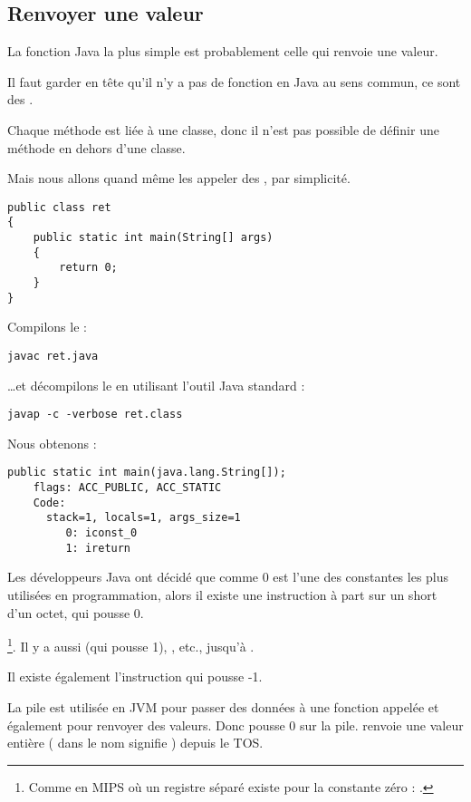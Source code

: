 \subsection{Renvoyer une valeur}

La fonction Java la plus simple est probablement celle qui renvoie une valeur.

Il faut garder en tête qu'il n'y a pas de fonction  en Java au sens commun,
ce sont des .

Chaque méthode est liée à une classe, donc il n'est pas possible de définir
une méthode en dehors d'une classe.

Mais nous allons quand même les appeler des , par simplicité.

\begin{lstlisting}[style=customjava]
public class ret
{
	public static int main(String[] args) 
	{
		return 0;
	}
}
\end{lstlisting}

Compilons le :

\begin{lstlisting}
javac ret.java
\end{lstlisting}

\dots et décompilons le en utilisant l'outil Java standard :

\begin{lstlisting}
javap -c -verbose ret.class
\end{lstlisting}

Nous obtenons :

\begin{lstlisting}[caption=JDK 1.7 (excerpt)]
  public static int main(java.lang.String[]);
    flags: ACC_PUBLIC, ACC_STATIC
    Code:
      stack=1, locals=1, args_size=1
         0: iconst_0      
         1: ireturn       
\end{lstlisting}

Les développeurs Java ont décidé que comme 0 est l'une des constantes les plus utilisées en programmation,
alors il existe une instruction à part sur un short d'un octet,  qui pousse 0.

\footnote{Comme en MIPS où un registre séparé existe pour la constante zéro : .}.
Il y a aussi  (qui pousse 1), , etc., jusqu'à .

Il existe également l'instruction  qui pousse -1.

La pile est utilisée en JVM pour passer des données à une fonction appelée et également pour renvoyer des valeurs.
Donc  pousse 0 sur la pile.
 renvoie une valeur entière ( dans le nom signifie ) depuis le \ac{TOS}.

